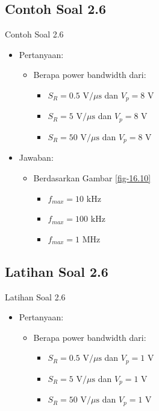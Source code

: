 \subsection{Contoh Soal 2.6}
\begin{frame}{Contoh Soal 2.6}
	\begin{itemize}
		\item Pertanyaan:
		\begin{itemize}
			\item Berapa power bandwidth dari:
			\begin{itemize}
				\item $ S_R = 0.5 \text{ V/}\mu\text{s} $ dan $ V_p = 8 \text{ V} $ 
				\item $ S_R = 5 \text{ V/}\mu\text{s} $ dan $ V_p = 8 \text{ V} $ 
				\item $ S_R = 50 \text{ V/}\mu\text{s} $ dan $ V_p = 8 \text{ V} $ 
			\end{itemize}
		\end{itemize}
		\item Jawaban:
		\begin{itemize}
			\item Berdasarkan Gambar \ref{fig-16.10}
			\begin{itemize}
				\item $ f_{max} = 10 \text{ kHz}$ 
				\item $ f_{max} = 100 \text{ kHz}$
				\item $ f_{max} = 1 \text{ MHz}$
			\end{itemize}
		\end{itemize}
	\end{itemize}
\end{frame}

\subsection{Latihan Soal 2.6}
\begin{frame}{Latihan Soal 2.6}
	\begin{itemize}
		\item Pertanyaan:
		\begin{itemize}
			\item Berapa power bandwidth dari:
			\begin{itemize}
				\item $ S_R = 0.5 \text{ V/}\mu\text{s} $ dan $ V_p = 1 \text{ V} $ 
				\item $ S_R = 5 \text{ V/}\mu\text{s} $ dan $ V_p = 1 \text{ V} $ 
				\item $ S_R = 50 \text{ V/}\mu\text{s} $ dan $ V_p = 1 \text{ V} $ 
			\end{itemize}
		\end{itemize}
	\end{itemize}
\end{frame}